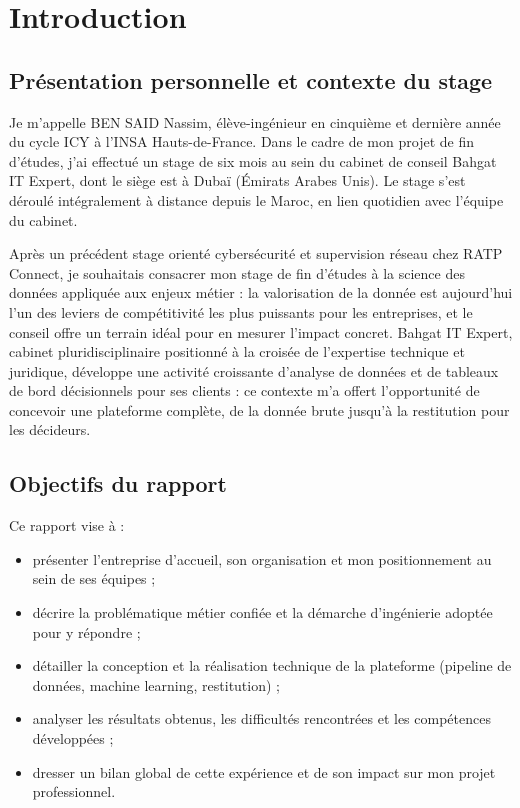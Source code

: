 \documentclass[12pt,a4paper]{report}
\begin{document}
\chapter{Introduction}

\section{Présentation personnelle et contexte du stage}

Je m'appelle BEN SAID Nassim, élève-ingénieur en cinquième et dernière année du
cycle ICY à l'INSA Hauts-de-France. Dans le cadre de mon projet de fin
d'études, j'ai effectué un stage de six mois au sein du cabinet de conseil
Bahgat IT Expert, dont le siège est à Dubaï (Émirats Arabes Unis). Le stage
s'est déroulé intégralement à distance depuis le Maroc, en lien quotidien avec
l'équipe du cabinet.

Après un précédent stage orienté cybersécurité et supervision réseau chez RATP
Connect, je souhaitais consacrer mon stage de fin d'études à la science des
données appliquée aux enjeux métier : la valorisation de la donnée est
aujourd'hui l'un des leviers de compétitivité les plus puissants pour les
entreprises, et le conseil offre un terrain idéal pour en mesurer l'impact
concret. Bahgat IT Expert, cabinet pluridisciplinaire positionné à la croisée
de l'expertise technique et juridique, développe une activité croissante
d'analyse de données et de tableaux de bord décisionnels pour ses clients : ce
contexte m'a offert l'opportunité de concevoir une plateforme complète, de la
donnée brute jusqu'à la restitution pour les décideurs.

\section{Objectifs du rapport}

Ce rapport vise à :
\begin{itemize}
  \item présenter l'entreprise d'accueil, son organisation et mon
    positionnement au sein de ses équipes ;
  \item décrire la problématique métier confiée et la démarche d'ingénierie
    adoptée pour y répondre ;
  \item détailler la conception et la réalisation technique de la plateforme
    (pipeline de données, machine learning, restitution) ;
  \item analyser les résultats obtenus, les difficultés rencontrées et les
    compétences développées ;
  \item dresser un bilan global de cette expérience et de son impact sur mon
    projet professionnel.
\end{itemize}
\end{document}
